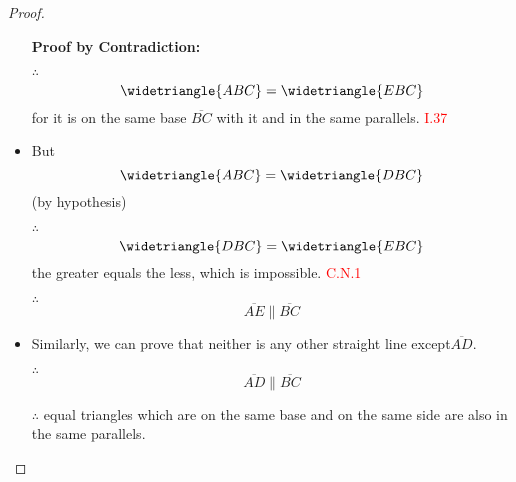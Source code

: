 \begin{proof}

\begin{itemize}

\item[]

\textbf{Proof by Contradiction:}

\item[$\therefore$]
\[ \widetriangle{ABC} = \widetriangle{EBC}\] 
for it is on the same base $\overline{BC}$ with it and in the same parallels. \hfill\textcolor{red}{I.37}

\item But 
\[\widetriangle{ABC} = \widetriangle{DBC}\] (by hypothesis)

\item[$\therefore$] 
\[\widetriangle{DBC} = \widetriangle{EBC}\] 
the greater equals the less, which is impossible.  \hfill\textcolor{red}{C.N.1}

\item[$\therefore$]
\[\overline{AE} \parallel \overline{BC}\]

\item Similarly, we can prove that neither is any other straight line except$ \overline{AD}$. 

\item[$\therefore$]
\[\overline{AD} \parallel \overline{BC}\]

\item[$\therefore$] equal triangles which are on the same base and on the same side are also in the same parallels.

\end{itemize}

\end{proof}

\clearpage
